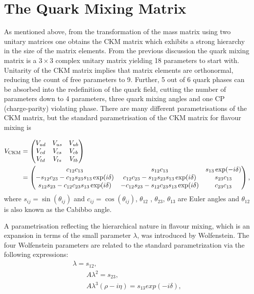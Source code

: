 



\section{The Quark Mixing Matrix}
\label{ckm}
As mentioned above, from the transformation of the mass matrix using two unitary matrices one obtains the \gls{CKM} matrix which exhibits a strong hierarchy in the size of the matrix elements. From the previous discussion the quark mixing matrix is a $3 \times 3$ complex unitary matrix yielding 18 parameters to start with. Unitarity of the \gls{CKM} matrix implies that matrix elements are orthonormal, reducing the count of free parameters to 9. Further, 5 out of 6 quark phases can be absorbed into the redefinition of the quark field, cutting the number of parameters down to 4 parameters, three quark mixing angles and one CP (charge-parity) violating phase. There are many different parametrisations of the \gls{CKM} matrix, but the standard parametrisation of the \gls{CKM} matrix for flavour mixing is

\begin{align}
V_{\rm CKM} &=  \begin{pmatrix}   V_{ud} & V_{us} & V_{ub} \cr
    V_{cd} & V_{cs} & V_{cb} \cr
    V_{td} & V_{ts} & V_{tb} \cr \end{pmatrix} \\
 &= \begin{pmatrix}c_{12}c_{13}& s_{12}c_{13} & s_{13}\exp(-i\delta) \cr
-s_{12}c_{23}-c_{12}s_{23}s_{13}\exp(i\delta) & c_{12}c_{23}- 
s_{12}s_{23}s_{13}\exp(i\delta) & s_{23}c_{13} \cr 
s_{12}s_{23}- c_{12}c_{23}s_{13}\exp(i\delta) & 
-c_{12}s_{23}-s_{12}c_{23}s_{13}\exp(i\delta) & c_{23}c_{13}\end{pmatrix},
\end{align}
where $s_{ij} = \sin(\theta_{ij})$ and $c_{ij} = \cos(\theta_{ij})$, $\theta_{12}$ , $\theta_{23}$, $\theta_{13}$ are Euler angles and $\theta_{12}$ is also known as the Cabibbo angle.

A parametrisation reflecting the hierarchical nature in flavour mixing, which is an expansion in terms of the small parameter $\lambda$, was introduced by Wolfenstein\cite{wolf}. The four Wolfenstein parameters are related to the standard parametrization via the following expressions:
\begin{equation}
\begin{split}
\lambda = s_{12}, \\
\qquad
A\lambda^{2} = s_{23}, \\
\qquad
A\lambda^{3}(\rho - i\eta) = s_{13}exp(-i\delta),\\
\end{split}
\end{equation}


